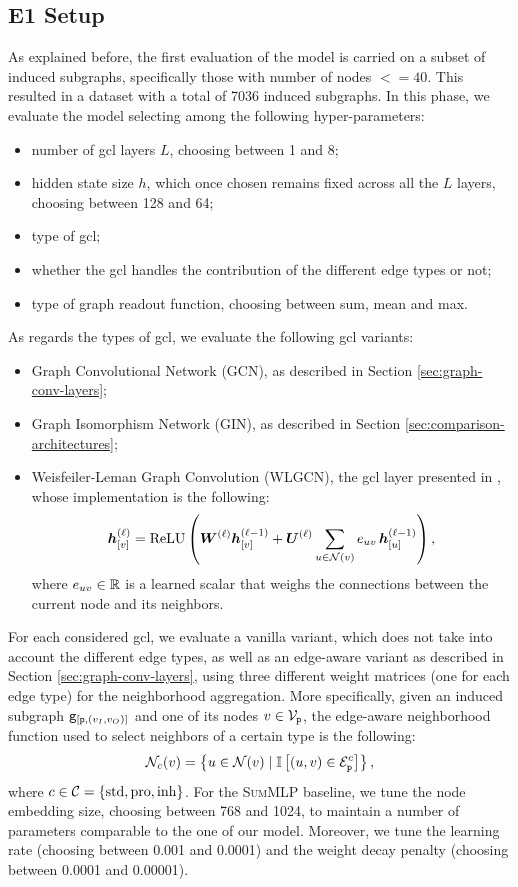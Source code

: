 \subsection{E1 Setup}
As explained before, the first evaluation of the model is carried on a subset of induced subgraphs, specifically those with number of nodes $<= 40$. This resulted in a dataset with a total of 7036 induced subgraphs. In this phase, we evaluate the model selecting among the following hyper-parameters:
\begin{itemize}
    \item number of \gls{gcl} layers $L$, choosing between 1 and 8;
    \item hidden state size $h$, which once chosen remains fixed across all the $L$ layers, choosing between 128 and 64;
    \item type of \gls{gcl};
    \item whether the \gls{gcl} handles the contribution of the different edge types or not;
    \item type of graph readout function, choosing between sum, mean and max.
\end{itemize}
As regards the types of \gls{gcl}, we evaluate the following \gls{gcl} variants:
\begin{itemize}
    \item Graph Convolutional Network (GCN), as described in Section \ref{sec:graph-conv-layers};
    \item Graph Isomorphism Network (GIN), as described in Section \ref{sec:comparison-architectures};
    \item Weisfeiler-Leman Graph Convolution (WLGCN), \ie the \gls{gcl} layer presented in \citep{morris2019weisfeilerLemangoneural}, whose implementation is the following:
    $$\StateVector{v}{\ell} = \relu\Par{\LayerMatrix{W}{\ell} \StateVector{v}{\ell-1} + \LayerMatrix{U}{\ell} \sum_{u \in \Neigh(v)} e_{uv}\, \StateVector{u}{\ell-1}},$$
    where $e_{uv} \in \mathbb{R}$ is a learned scalar that weighs the connections between the current node and its neighbors.
\end{itemize}
For each considered \gls{gcl}, we evaluate a vanilla variant, which does not take into account the different edge types, as well as an edge-aware variant as described in Section \ref{sec:graph-conv-layers}, using three different weight matrices (one for each edge type) for the neighborhood aggregation. More specifically, given an induced subgraph $\mathtt{g}_{[\mathtt{p}, (v_I,v_O)]}$ and one of its nodes $v \in \Nodes{p}$, the edge-aware neighborhood function used to select neighbors of a certain type is the following:
$$\Neigh_c(v) = \Set{u \in \Neigh(v) \mid \Indicator{(u,v) \in \Edges{p}^c}},$$
where $c \in \Cal{C} = \Set{\Fun{std}, \Fun{pro}, \Fun{inh}}$.
For the \textsc{SumMLP} baseline, we tune the node embedding size, choosing between 768 and 1024, to maintain a number of parameters comparable to the one of our model. Moreover, we tune the learning rate (choosing between 0.001 and 0.0001) and the weight decay penalty (choosing between 0.0001 and 0.00001).

